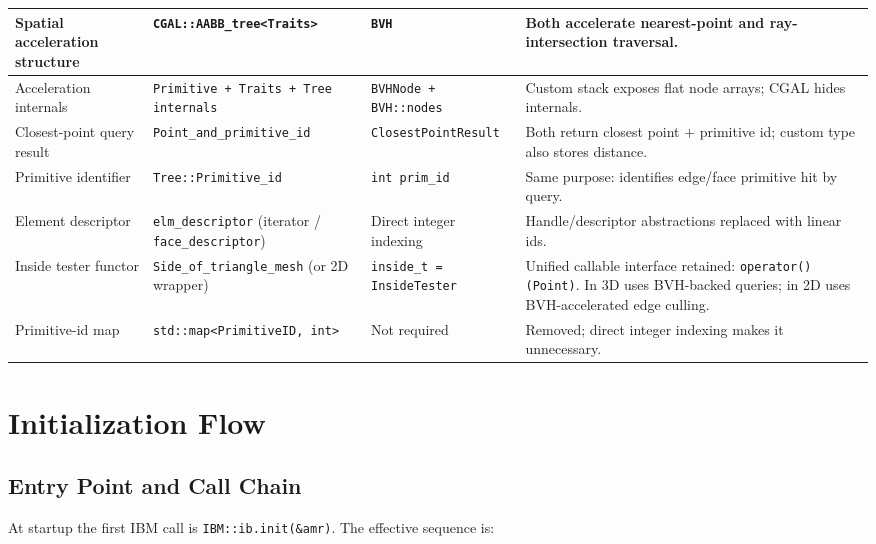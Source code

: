 \documentclass[11pt,a4paper]{article}
\begin{document}
\begin{longtable}{p{} p{} p{} p{}}
Spatial acceleration structure
  & \texttt{CGAL::AABB\_tree<Traits>}
  & \texttt{BVH}
  & Both accelerate nearest-point and ray-intersection traversal. \\ \midrule

Acceleration internals
  & \texttt{Primitive + Traits + Tree internals}
  & \texttt{BVHNode + BVH::nodes}
  & Custom stack exposes flat node arrays; CGAL hides internals. \\ \midrule

Closest-point query result
  & \texttt{Point\_and\_primitive\_id}
  & \texttt{ClosestPointResult}
  & Both return closest point + primitive id; custom type also stores distance. \\ \midrule

Primitive identifier
  & \texttt{Tree::Primitive\_id}
  & \texttt{int prim\_id}
  & Same purpose: identifies edge/face primitive hit by query. \\ \midrule

Element descriptor
  & \texttt{elm\_descriptor} (iterator / \texttt{face\_descriptor})
  & Direct integer indexing
  & Handle/descriptor abstractions replaced with linear ids. \\ \midrule

Inside tester functor
  & \texttt{Side\_of\_triangle\_mesh} (or 2D wrapper)
  & \texttt{inside\_t = InsideTester}
  & Unified callable interface retained: \texttt{operator()(Point)}.
    In 3D uses BVH-backed queries; in 2D uses BVH-accelerated edge culling. \\ \midrule

Primitive-id map
  & \texttt{std::map<PrimitiveID, int>}
  & Not required
  & Removed; direct integer indexing makes it unnecessary. \\ \bottomrule

\end{longtable}

\section{Initialization Flow}

\subsection{Entry Point and Call Chain}

At startup the first IBM call is \texttt{IBM::ib.init(\&amr)}.
The effective sequence is:
\end{document}
